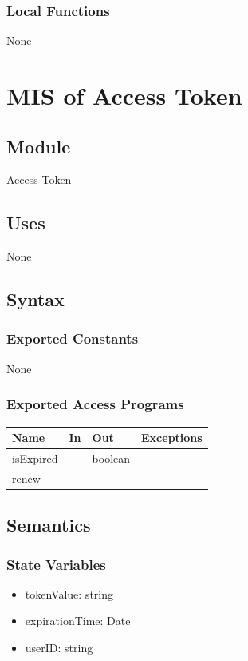 \documentclass[12pt, titlepage]{article}
\begin{document}
\subsubsection{Local Functions}
None

\section{MIS of Access Token} \label{at}

\subsection{Module}

Access Token

\subsection{Uses}
None

\subsection{Syntax}

\subsubsection{Exported Constants}
None
\subsubsection{Exported Access Programs}

\begin{center}
\begin{tabular}{p{2cm} p{4cm} p{4cm} p{2cm}}
\hline
\textbf{Name} & \textbf{In} & \textbf{Out} & \textbf{Exceptions} \\
\hline
isExpired & - & boolean & - \\
renew & - & - & - \\
\hline
\end{tabular}
\end{center}

\subsection{Semantics}

\subsubsection{State Variables}
\begin{itemize}
    \item tokenValue: string
    \item expirationTime: Date
    \item userID: string
\end{itemize}
\end{document}
